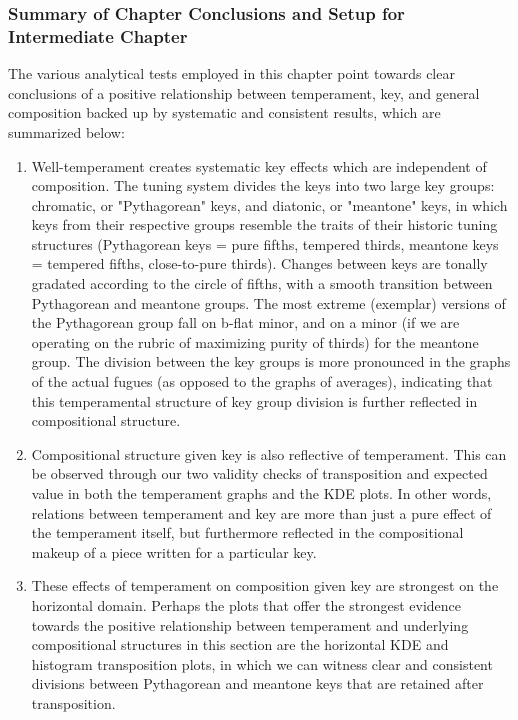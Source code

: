 \subsubsection{Summary of Chapter Conclusions and Setup for Intermediate
Chapter}\label{summary-of-chapter-conclusions-and-setup-for-intermediate-chapter}

The various analytical tests employed in this chapter point towards
clear conclusions of a positive relationship between temperament, key,
and general composition backed up by systematic and consistent results,
which are summarized below:

\begin{enumerate}
\def\labelenumi{\arabic{enumi}.}
\tightlist
\item
  Well-temperament creates systematic key effects which are independent
  of composition. The tuning system divides the keys into two large key
  groups: chromatic, or "Pythagorean" keys, and diatonic, or "meantone"
  keys, in which keys from their respective groups resemble the traits
  of their historic tuning structures (Pythagorean keys = pure fifths,
  tempered thirds, meantone keys = tempered fifths, close-to-pure
  thirds). Changes between keys are tonally gradated according to the
  circle of fifths, with a smooth transition between Pythagorean and
  meantone groups. The most extreme (exemplar) versions of the
  Pythagorean group fall on b-flat minor, and on a minor (if we are
  operating on the rubric of maximizing purity of thirds) for the
  meantone group. The division between the key groups is more pronounced
  in the graphs of the actual fugues (as opposed to the graphs of
  averages), indicating that this temperamental structure of key group
  division is further reflected in compositional structure.
\item
  Compositional structure given key is also reflective of temperament.
  This can be observed through our two validity checks of transposition
  and expected value in both the temperament graphs and the KDE plots.
  In other words, relations between temperament and key are more than
  just a pure effect of the temperament itself, but furthermore
  reflected in the compositional makeup of a piece written for a
  particular key.
\item
  These effects of temperament on composition given key are strongest on
  the horizontal domain. Perhaps the plots that offer the strongest
  evidence towards the positive relationship between temperament and
  underlying compositional structures in this section are the horizontal
  KDE and histogram transposition plots, in which we can witness clear
  and consistent divisions between Pythagorean and meantone keys that
  are retained after transposition.
\end{enumerate}

